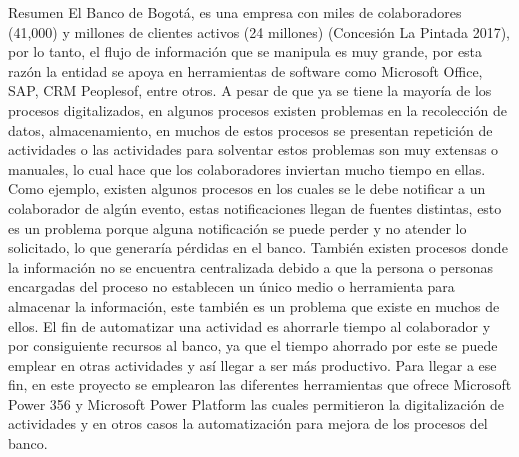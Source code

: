 \begin{prologo}{Resumen}      
	El Banco de Bogotá, es una empresa con miles de colaboradores (41,000) y millones de clientes activos (24 millones) (Concesión La Pintada 2017), por lo tanto, el flujo de información que se manipula es muy grande, por esta razón la entidad se apoya en herramientas de software como Microsoft Office, SAP, CRM Peoplesof, entre otros. A pesar de que ya se tiene la mayoría de los procesos digitalizados, en algunos procesos existen problemas en la recolección de datos, almacenamiento, en muchos de estos procesos se presentan repetición de actividades o las actividades para solventar estos problemas son muy extensas o manuales, lo cual hace que los colaboradores inviertan mucho tiempo en ellas. \\
	
	Como ejemplo, existen algunos  procesos en los cuales se le debe notificar a un colaborador de algún evento, estas notificaciones llegan de fuentes distintas, esto es un problema porque alguna notificación se puede perder y no atender lo solicitado, lo que generaría pérdidas en el banco. También existen procesos donde la información no se encuentra centralizada debido a que la persona o personas encargadas del proceso no establecen un único medio o herramienta para almacenar la información, este también es un problema que existe en muchos de ellos. El fin de automatizar una actividad es ahorrarle tiempo al colaborador y por consiguiente recursos al banco, ya que el tiempo ahorrado por este se puede emplear en otras actividades y así llegar a ser más productivo. Para llegar a ese fin, en este proyecto se emplearon las diferentes herramientas que ofrece Microsoft Power 356 y Microsoft Power Platform las cuales permitieron la digitalización de actividades y en otros casos la automatización para mejora de los procesos del banco.
\end{prologo}



